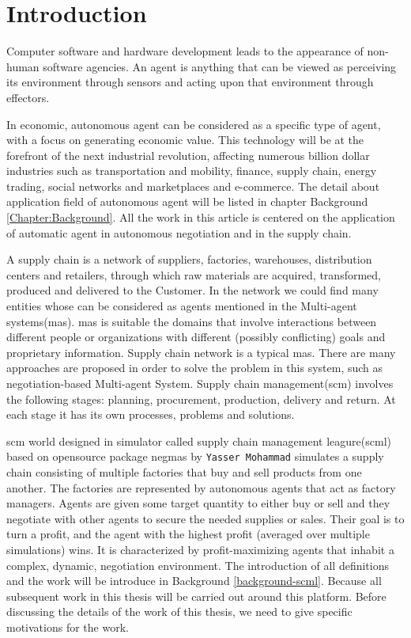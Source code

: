 \chapter{Introduction}
Computer software and hardware development leads to the appearance of non-human software agencies. An agent is anything that can be viewed as perceiving its environment through sensors and acting upon that environment through effectors\parencite{RePEc:aes:infoec:v:xi:y:2007:i:4:p:115-118}.

In economic, autonomous agent can be considered as a specific type of agent, with a focus on generating economic value. This technology will be at the forefront of the next industrial revolution, affecting numerous billion dollar industries such as transportation and mobility, finance, supply chain, energy trading, social networks and marketplaces and e-commerce. The detail about application field of autonomous agent will be listed in chapter Background \ref{Chapter:Background}. All the work in this article is centered on the application of automatic agent in autonomous negotiation and in the supply chain.

A supply chain is a network of suppliers, factories, warehouses, distribution centers and retailers, through which raw materials are acquired, transformed, produced and delivered to the Customer. In the network we could find many entities whose can be considered as agents mentioned in the Multi-agent systems(\gls{mas}). \gls{mas} is suitable the domains that involve interactions between different people or organizations with different (possibly conflicting) goals and proprietary information. Supply chain network is a typical \gls{mas}. There are many approaches are proposed in order to solve the problem in this system, such as negotiation-based Multi-agent System\parencite{Chen1999ANM, DBLP:journals/corr/abs-1210-3375}. Supply chain management(\gls{scm}) involves the following stages: planning, procurement, production, delivery and return. At each stage it has its own processes, problems and solutions\parencite{Darja2011}.

\gls{scm} world designed in simulator called supply chain management leagure(\gls{scml}) based on opensource package \gls{negmas} by \texttt{Yasser Mohammad} simulates a supply chain consisting of multiple factories that buy and sell products from one another. The factories are represented by autonomous agents that act as factory managers. Agents are given some target quantity to either buy or sell and they negotiate with other agents to secure the needed supplies or sales. Their goal is to turn a profit, and the agent with the highest profit (averaged over multiple simulations) wins. It is characterized by profit-maximizing agents that inhabit a complex, dynamic, negotiation environment\parencite{Mohammad2019}. The introduction of all definitions and the work will be introduce in Background \ref{background-scml}. Because all subsequent work in this thesis will be carried out around this platform. Before discussing the details of the work of this thesis, we need to give specific motivations for the work. 

